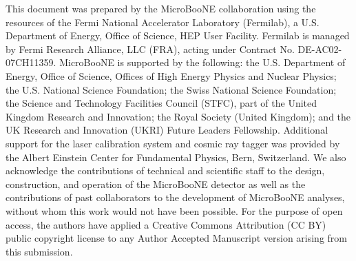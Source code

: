 \documentclass[aps,prl,twocolumn,superscriptaddress]{revtex4}
\begin{document}
This document was prepared by the MicroBooNE collaboration using the resources of the Fermi National Accelerator Laboratory (Fermilab), a U.S. Department of Energy, Office of Science, HEP User Facility. Fermilab is managed by Fermi Research Alliance, LLC (FRA), acting under Contract No. DE-AC02-07CH11359. MicroBooNE is supported by the following: the U.S. Department of Energy, Office of Science, Offices of High Energy Physics and Nuclear Physics; the U.S. National Science Foundation; the Swiss National Science Foundation; the Science and Technology Facilities Council (STFC), part of the United Kingdom Research and Innovation; the Royal Society (United Kingdom); and the UK Research and Innovation (UKRI) Future Leaders Fellowship. Additional support for  the laser calibration system and cosmic ray tagger was provided by the Albert Einstein Center for Fundamental Physics, Bern, Switzerland. We  also acknowledge the contributions of technical and scientific staff to the design, construction, and operation of the MicroBooNE detector as well as the contributions of past collaborators to the development of MicroBooNE analyses, without whom this work would not have been possible. For the purpose of open access, the authors have applied a Creative Commons Attribution (CC BY) public copyright license to any Author Accepted Manuscript version arising from this submission.
\end{document}

